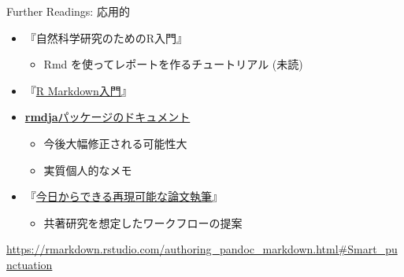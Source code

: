 \documentclass[
  ignorenonframetext,
]{beamer}
\providecommand{\tightlist}{%
  \setlength{\itemsep}{0pt}\setlength{\parskip}{0pt}}
\begin{document}
\begin{frame}{Further Readings: 応用的}
\protect\hypertarget{further-readings-ux5fdcux7528ux7684}{}
\begin{itemize}
\item
  『自然科学研究のためのR入門』\autocite{Eguchi2018}

  \begin{itemize}
  \tightlist
  \item
    Rmd を使ってレポートを作るチュートリアル (未読)
  \end{itemize}
\item
  『\href{https://kazutan.github.io/kazutanR/Rmd_intro.html}{R Markdown入門}』
\item
  \href{https://gedevan-aleksizde.github.io/rmdja/}{\textbf{rmdja}パッケージのドキュメント}

  \begin{itemize}
  \tightlist
  \item
    今後大幅修正される可能性大
  \item
    実質個人的なメモ
  \end{itemize}
\item
  『\href{https://ykunisato.github.io/jpa2020-tws-002/}{今日からできる再現可能な論文執筆}』

  \begin{itemize}
  \tightlist
  \item
    共著研究を想定したワークフローの提案
  \end{itemize}
\end{itemize}

\url{https://rmarkdown.rstudio.com/authoring_pandoc_markdown.html\#Smart_punctuation}
\end{frame}
\end{document}
